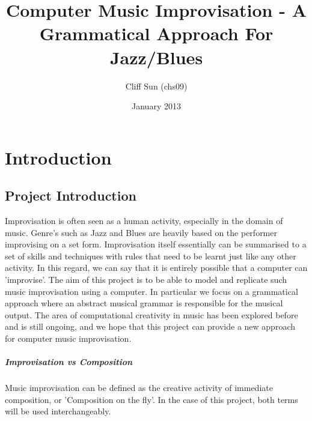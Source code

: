 \documentclass[pdftex,12pt,a4paper]{report}
\begin{document}
\title{Computer Music Improvisation - A Grammatical Approach For Jazz/Blues}
\author{Cliff Sun (chs09)}
\date{January 2013}
\maketitle


\setcounter{tocdepth}{2} %

\tableofcontents

\pagebreak

\renewcommand*\thesection{\arabic{section}}



\pagebreak

\chapter{Introduction}

\section{Project Introduction}
Improvisation is often seen as a human activity, especially in the domain of music. Genre's such as Jazz and Blues are heavily based on the performer improvising on a set form. Improvisation itself essentially can be summarised to a set of skills and techniques with rules that need to be learnt just like any other activity. In this regard, we can say that it is entirely possible that a computer can 'improvise'. The aim of this project is to be able to model and replicate such music improvisation using a computer. In particular we focus on a grammatical approach where an abstract musical grammar is responsible for the musical output. The area of computational creativity in music has been explored before and is still ongoing, and we hope that this project can provide a new approach for computer music improvisation.

\paragraph{Improvisation vs Composition}
Music improvisation can be defined as the creative activity of immediate composition, or 'Composition on the fly'. In the case of this project, both terms will be used interchangeably.
\end{document}
